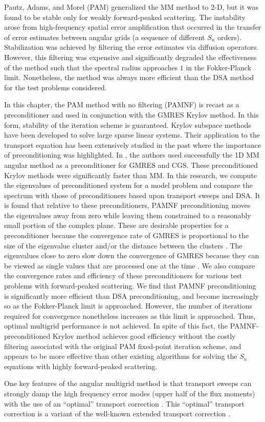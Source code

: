 Pautz, Adams, and Morel (PAM) \cite{multigrid_2d} generalized the MM method to
2-D, but it was found to be stable only for weakly forward-peaked scattering.
The instability arose from high-frequency spatial error amplification that
occurred in the transfer of error estimates between angular grids (a sequence
of different $S_n$ orders). Stabilization was achieved by filtering the error
estimates via diffusion operators. However, this filtering was expensive and
significantly degraded the effectiveness of the method such that the spectral
radius approaches $1$ in the Fokker-Planck limit.  Nonetheless, the method was 
always more efficient than the DSA method for the test problems considered.

In this chapter, the PAM method with no filtering (PAMNF) is recast as a 
preconditioner and used in conjunction with the GMRES Krylov method. In this form, 
stability of the iteration scheme is guaranteed. Krylov subspace methods have been 
developed to solve large sparse linear systems. Their application to the transport 
equation has been extensively studied in the past \cite{faber,oliveira,patton,warsa} 
where the importance of preconditioning was highlighted. In \cite{oliveira}, the 
authors used successfully the 1D MM angular method as a preconditioner for GMRES 
and CGS. These preconditioned Krylov methods were significantly faster than MM. 
In this research, we compute the eigenvalues of preconditioned system for a model 
problem and compare the spectrum with those of preconditioners based upon transport 
sweeps and DSA. It is found that relative to these preconditioners, PAMNF 
preconditioning moves the eigenvalues away from zero while leaving them 
constrained to a reasonably small portion of the complex plane. These are 
desirable properties for a preconditioner because the convergence rate of GMRES 
is proportional to the size of the eigenvalue cluster and/or the distance between 
the clusters \cite{warsa,campbell}. The eigenvalues close to zero slow down the 
convergence of GMRES because they can be viewed as single values that are processed 
one at the time \cite{warsa,campbell}. We also compare the convergence rates and 
efficiency of these preconditioners for various test problems with forward-peaked 
scattering. We find that PAMNF preconditioning is significantly more efficient 
than DSA preconditioning, and become increasingly so as the Fokker-Planck limit 
is approached. However, the number of iterations required for convergence 
nonetheless increases as this limit is approached. Thus, optimal multigrid 
performance is not achieved. In spite of this fact, the PAMNF-preconditioned 
Krylov method achieves good efficiency without the costly filtering associated 
with the original PAM fixed-point iteration scheme, and appears to be more 
effective than other existing algorithms for solving the $S_n$ equations with 
highly forward-peaked scattering.

One key features of the angular multigrid method is that transport sweeps can
strongly damp the high frequency error modes (upper half of the flux moments)
with the use of an ``optimal'' transport correction \cite{multigrid_1d}. This
``optimal'' transport correction is a variant of the well-known extended
transport correction \cite{lathrop,morel_79}.

